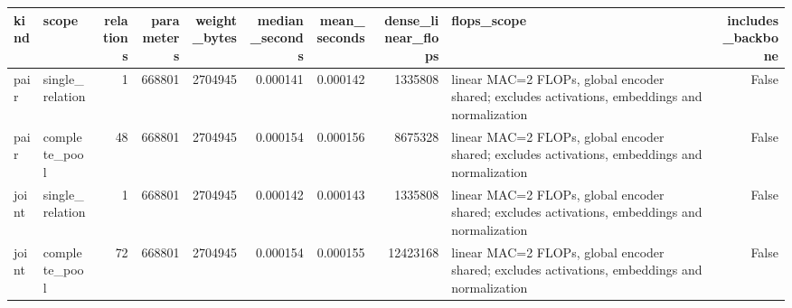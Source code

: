 \begin{tabular}{llrrrrrrlr}
\toprule
kind & scope & relations & parameters & weight_bytes & median_seconds & mean_seconds & dense_linear_flops & flops_scope & includes_backbone \\
\midrule
pair & single_relation & 1 & 668801 & 2704945 & 0.000141 & 0.000142 & 1335808 & linear MAC=2 FLOPs, global encoder shared; excludes activations, embeddings and normalization & False \\
pair & complete_pool & 48 & 668801 & 2704945 & 0.000154 & 0.000156 & 8675328 & linear MAC=2 FLOPs, global encoder shared; excludes activations, embeddings and normalization & False \\
joint & single_relation & 1 & 668801 & 2704945 & 0.000142 & 0.000143 & 1335808 & linear MAC=2 FLOPs, global encoder shared; excludes activations, embeddings and normalization & False \\
joint & complete_pool & 72 & 668801 & 2704945 & 0.000154 & 0.000155 & 12423168 & linear MAC=2 FLOPs, global encoder shared; excludes activations, embeddings and normalization & False \\
\bottomrule
\end{tabular}
